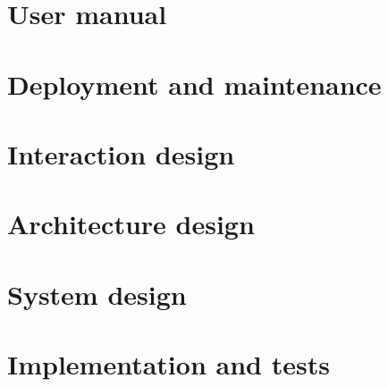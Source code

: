 \documentclass[a4paper,twoside]{report}
\begin{document}
\chapter{User manual}


\chapter{Deployment and maintenance}


\chapter{Interaction design}


\chapter{Architecture design}


\chapter{System design}


\chapter{Implementation and tests}




\end{document}
